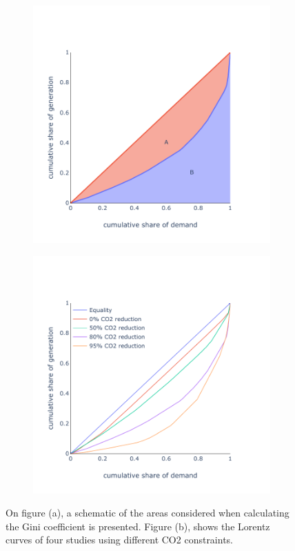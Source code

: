 \begin{figure}[h]\centering
	\begin{subfigure}{.5\textwidth}
		\centering
		\includegraphics[width=1.\textwidth]{./Images/Gini_1}
		\caption{}
		\label{fig:Gini_1}
	\end{subfigure}%
	\begin{subfigure}{.5\textwidth}
		\centering
		\includegraphics[width=1.\textwidth]{./Images/Gini_2}
		\caption{}
		\label{fig:Gini_2}
	\end{subfigure}
	\caption{On figure (a), a schematic of the areas considered when calculating the Gini coefficient is presented. Figure (b), shows the Lorentz curves of four studies using different CO2 constraints.}
	\label{fig:Gini}
\end{figure}

